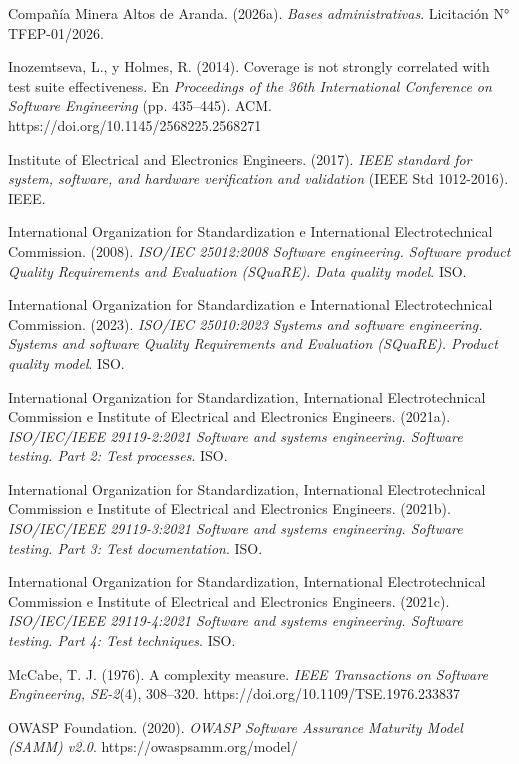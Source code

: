 \documentclass[anexo]{../../comun/overfore}
\begin{document}
\begin{referencias}
\item Compañía Minera Altos de Aranda. (2026a). \emph{Bases administrativas}. Licitación N° TFEP-01/2026.
\item Inozemtseva, L., y Holmes, R. (2014). Coverage is not strongly correlated with test suite effectiveness. En \emph{Proceedings of the 36th International Conference on Software Engineering} (pp. 435–445). ACM. https://doi.org/10.1145/2568225.2568271
\item Institute of Electrical and Electronics Engineers. (2017). \emph{IEEE standard for system, software, and hardware verification and validation} (IEEE Std 1012-2016). IEEE.
\item International Organization for Standardization e International Electrotechnical Commission. (2008). \emph{ISO/IEC 25012:2008 Software engineering. Software product Quality Requirements and Evaluation (SQuaRE). Data quality model}. ISO.
\item International Organization for Standardization e International Electrotechnical Commission. (2023). \emph{ISO/IEC 25010:2023 Systems and software engineering. Systems and software Quality Requirements and Evaluation (SQuaRE). Product quality model}. ISO.
\item International Organization for Standardization, International Electrotechnical Commission e Institute of Electrical and Electronics Engineers. (2021a). \emph{ISO/IEC/IEEE 29119-2:2021 Software and systems engineering. Software testing. Part 2: Test processes}. ISO.
\item International Organization for Standardization, International Electrotechnical Commission e Institute of Electrical and Electronics Engineers. (2021b). \emph{ISO/IEC/IEEE 29119-3:2021 Software and systems engineering. Software testing. Part 3: Test documentation}. ISO.
\item International Organization for Standardization, International Electrotechnical Commission e Institute of Electrical and Electronics Engineers. (2021c). \emph{ISO/IEC/IEEE 29119-4:2021 Software and systems engineering. Software testing. Part 4: Test techniques}. ISO.
\item McCabe, T. J. (1976). A complexity measure. \emph{IEEE Transactions on Software Engineering, SE-2}(4), 308–320. https://doi.org/10.1109/TSE.1976.233837
\item OWASP Foundation. (2020). \emph{OWASP Software Assurance Maturity Model (SAMM) v2.0}. https://owaspsamm.org/model/

\end{referencias}
\end{document}
